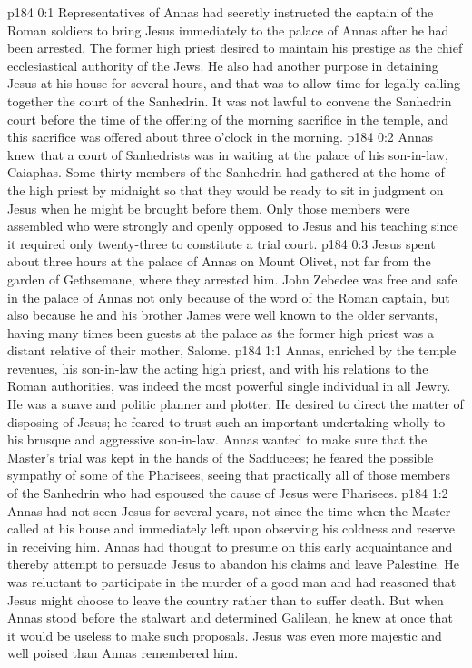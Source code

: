 \author{Midwayer Commission}
\vs p184 0:1 Representatives of Annas had secretly instructed the captain of the Roman soldiers to bring Jesus immediately to the palace of Annas after he had been arrested. The former high priest desired to maintain his prestige as the chief ecclesiastical authority of the Jews. He also had another purpose in detaining Jesus at his house for several hours, and that was to allow time for legally calling together the court of the Sanhedrin. It was not lawful to convene the Sanhedrin court before the time of the offering of the morning sacrifice in the temple, and this sacrifice was offered about three o’clock in the morning.
\vs p184 0:2 Annas knew that a court of Sanhedrists was in waiting at the palace of his son\hyp{}in\hyp{}law, Caiaphas. Some thirty members of the Sanhedrin had gathered at the home of the high priest by midnight so that they would be ready to sit in judgment on Jesus when he might be brought before them. Only those members were assembled who were strongly and openly opposed to Jesus and his teaching since it required only twenty\hyp{}three to constitute a trial court.\plusone
\vs p184 0:3 Jesus spent about three hours at the palace of Annas on Mount Olivet, not far from the garden of Gethsemane, where they arrested him. John Zebedee was free and safe in the palace of Annas not only because of the word of the Roman captain, but also because he and his brother James were well known to the older servants, having many times been guests at the palace as the former high priest was a distant relative of their mother, Salome.
\vs p184 1:1 Annas, enriched by the temple revenues, his son\hyp{}in\hyp{}law the acting high priest, and with his relations to the Roman authorities, was indeed the most powerful single individual in all Jewry. He was a suave and politic planner and plotter. He desired to direct the matter of disposing of Jesus; he feared to trust such an important undertaking wholly to his brusque and aggressive son\hyp{}in\hyp{}law. Annas wanted to make sure that the Master’s trial was kept in the hands of the Sadducees; he feared the possible sympathy of some of the Pharisees, seeing that practically all of those members of the Sanhedrin who had espoused the cause of Jesus were Pharisees.
\vs p184 1:2 Annas had not seen Jesus for several years, not since the time when the Master called at his house and immediately left upon observing his coldness and reserve in receiving him. Annas had thought to presume on this early acquaintance and thereby attempt to persuade Jesus to abandon his claims and leave Palestine. He was reluctant to participate in the murder of a good man and had reasoned that Jesus might choose to leave the country rather than to suffer death. But when Annas stood before the stalwart and determined Galilean, he knew at once that it would be useless to make such proposals. Jesus was even more majestic and well poised than Annas remembered him.
